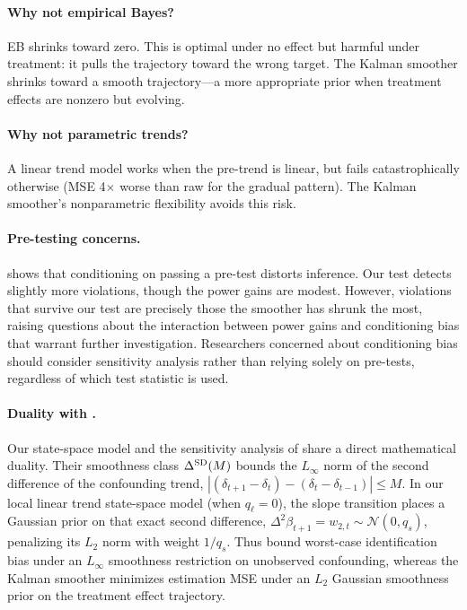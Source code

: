 \documentclass[12pt]{article}
\begin{document}
\paragraph{Why not empirical Bayes?} EB shrinks toward zero. This is optimal under no effect but harmful under treatment: it pulls the trajectory toward the wrong target. The Kalman smoother shrinks toward a smooth trajectory---a more appropriate prior when treatment effects are nonzero but evolving.

\paragraph{Why not parametric trends?} A linear trend model works when the pre-trend is linear, but fails catastrophically otherwise (MSE 4$\times$ worse than raw for the gradual pattern). The Kalman smoother's nonparametric flexibility avoids this risk.

\paragraph{Pre-testing concerns.} \citet{roth2022pretest} shows that conditioning on passing a pre-test distorts inference. Our test detects slightly more violations, though the power gains are modest. However, violations that survive our test are precisely those the smoother has shrunk the most, raising questions about the interaction between power gains and conditioning bias that warrant further investigation. Researchers concerned about conditioning bias should consider sensitivity analysis \citep{rambachan2023more} rather than relying solely on pre-tests, regardless of which test statistic is used.

\paragraph{Duality with \citet{rambachan2023more}.} Our state-space model and the sensitivity analysis of \citet{rambachan2023more} share a direct mathematical duality. Their smoothness class $\Delta^{\rm SD}(M)$ bounds the $L_\infty$ norm of the second difference of the confounding trend, $|(\delta_{t+1} - \delta_t) - (\delta_t - \delta_{t-1})| \le M$. In our local linear trend state-space model (when $q_\ell = 0$), the slope transition places a Gaussian prior on that exact second difference, $\Delta^2 \beta_{t+1} = w_{2,t} \sim \mathcal{N}(0, q_s)$, penalizing its $L_2$ norm with weight $1/q_s$. Thus \citet{rambachan2023more} bound worst-case identification bias under an $L_\infty$ smoothness restriction on unobserved confounding, whereas the Kalman smoother minimizes estimation MSE under an $L_2$ Gaussian smoothness prior on the treatment effect trajectory.
\end{document}

